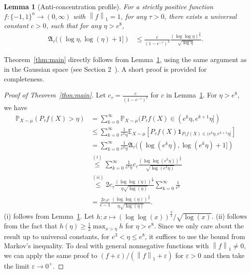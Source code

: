 \documentclass[11pt]{article}
\newcommand{\fA}{\mathfrak{A}}
\theoremstyle{named}
\theoremstyle{plain}
\newtheorem{lemma}{Lemma}
\newcommand{\Exs}{\ensuremath{{\mathbb{E}}}}
\newcommand{\Prob}{\ensuremath{{\mathbb{P}}}}
\newcommand{\brackets}[1]{\left[ #1 \right]}
\newcommand{\parenth}[1]{\left( #1 \right)}
\newcommand{\vecnorm}[2]{\left\| #1\right\|_{#2}}
\begin{document}
\begin{lemma}[Anti-concentration profile]
  \label{lem:anti_concentration}
  For a strictly positive function $f : \{-1,1\}^n \to (0,\infty)$ with $\vecnorm{f}{1} = 1$, for any $\tau > 0$, there exists a universal constant $c > 0$, such that for any $\eta > e^{8}$, 
  \begin{align*}
    \fA_\tau((\log \eta, \log(\eta) + 1]) 
    &\leq \frac{c}{\parenth{1-e^{-\tau}}^2} \frac{\parenth{\log \log \eta}^{\frac32}}{\sqrt{\log \eta}}.
  \end{align*}
\end{lemma}

Theorem~\ref{thm:main} directly follows from Lemma~\ref{lem:anti_concentration}, using the same argument as in the Gaussian space (see Section 2~\cite{eldan2018regularization}). A short proof is provided for completeness. 
\begin{proof}[Proof of Theorem~\ref{thm:main}]
  Let $c_\tau = \frac{c}{\parenth{1-e^{-\tau}}^2}$ for $c$ in Lemma~\ref{lem:anti_concentration}. For $\eta > e^8$, we have 
  \begin{align*}
    \Prob_{X\sim \mu}(P_\tau f (X) > \eta) &= \sum_{k=0}^\infty \Prob_{X\sim \mu}(P_\tau f (X) \in (e^k \eta, e^{k+1} \eta]) \\
    &\leq \sum_{k=0}^\infty \frac{1}{e^k \eta} \Exs _{X\sim \mu} \brackets{P_\tau f (X) \mathbf{1}_{ P_\tau f (X) \in (e^k \eta, e^{k+1} \eta]} } \\
    &= \sum_{k=0}^\infty \frac{1}{e^k \eta} \fA_\tau((\log (e^{k} \eta), \log(e^k \eta) + 1]) \\
    &\overset{(i)}{\leq} \sum_{k=0}^\infty \frac{1}{e^k \eta} c_\tau \frac{\parenth{\log \log (e^k \eta)}^{\frac32}}{\sqrt{\log (e^k\eta)}} \\
    &\overset{(ii)}{\leq}  2 c_\tau \frac{ \parenth{\log \log (\eta)}^{\frac32} }{\eta \sqrt{\log (\eta)}} \sum_{k=0}^\infty \frac{1}{e^k} \\
    &=  \frac{2 c_\tau e}{e-1} \frac{ \parenth{\log \log (\eta)}^{\frac32} }{\eta \sqrt{\log (\eta)}}.
  \end{align*}
  (i) follows from Lemma~\ref{lem:anti_concentration}. Let $h: x\mapsto \parenth{\log \log (x)}^{\frac32}/ \sqrt{\log (x)}$. (ii) follows from the fact that $h(\eta) \geq \frac{1}{2} \max_{x > \eta} h$ for $\eta > e^8$. Since we only care about the result up to universal constants, for $e^3 < \eta \leq e^{8}$, it suffices to use the bound from Markov's inequality. To deal with general nonnegative functions with $\vecnorm{f}{1} \neq 0$, we can apply the same proof to $(f + \varepsilon)/(\vecnorm{f}{1} + \varepsilon)$ for $\varepsilon > 0$ and then take the limit $\varepsilon \to 0^+$.
\end{proof}
\end{document}
